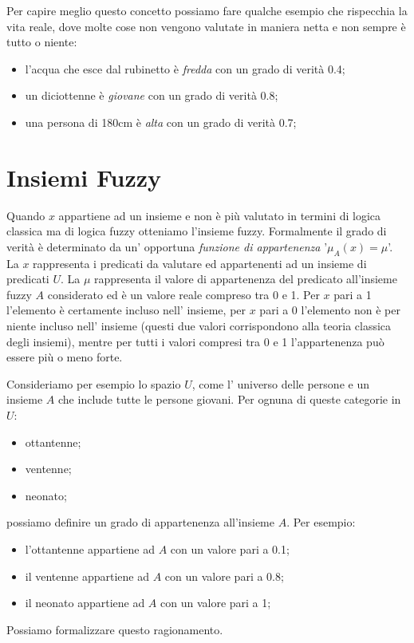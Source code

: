 \documentclass[a4paper,12pt]{report}
\begin{document}
\bigskip

Per capire meglio questo concetto possiamo fare qualche esempio che rispecchia la vita reale, dove molte cose non vengono valutate in maniera netta e non sempre è tutto o niente:


\begin{itemize}
    \item l'acqua che esce dal rubinetto è  \textit{fredda} con un grado di verità 0.4;
    \item un diciottenne è \textit{giovane} con un grado di verità 0.8;
    \item una persona di 180cm è \textit{alta} con un grado di verità 0.7;
\end{itemize}



\section{Insiemi Fuzzy}
Quando $x$ appartiene ad un insieme e non è più valutato in termini di logica classica ma di logica fuzzy otteniamo l'insieme fuzzy. 
Formalmente il grado di verità è determinato da un' opportuna \textit{funzione di appartenenza} '$\mu_A(x) = \mu$'. 
La $x$ rappresenta i predicati da valutare ed appartenenti ad un insieme di predicati $U$. La $\mu$ rappresenta il valore di appartenenza del predicato all'insieme fuzzy $A$ considerato ed è un valore reale compreso tra 0 e 1. 
Per $x$ pari a 1 l’elemento è certamente incluso nell’ insieme, per $x$ pari a 0
l’elemento non è per niente incluso nell’ insieme (questi due valori corrispondono alla teoria classica degli insiemi), mentre per tutti i valori compresi tra 0 e 1 l’appartenenza può essere più o meno forte.

\bigskip

Consideriamo per esempio lo spazio $U$, come l' universo delle persone e un insieme $A$ che include tutte le persone giovani. Per ognuna di queste categorie in $U$:
\begin{itemize}
    \item ottantenne;
    \item ventenne;
    \item neonato;
\end{itemize}
possiamo definire un grado di appartenenza all'insieme $A$. Per esempio:
\begin{itemize}
    \item l'ottantenne appartiene ad $A$ con un valore pari a 0.1;
    \item il ventenne appartiene ad $A$ con un valore pari a 0.8;
    \item il neonato appartiene ad $A$ con un valore pari a 1;
\end{itemize}
Possiamo formalizzare questo ragionamento. 
\end{document}
